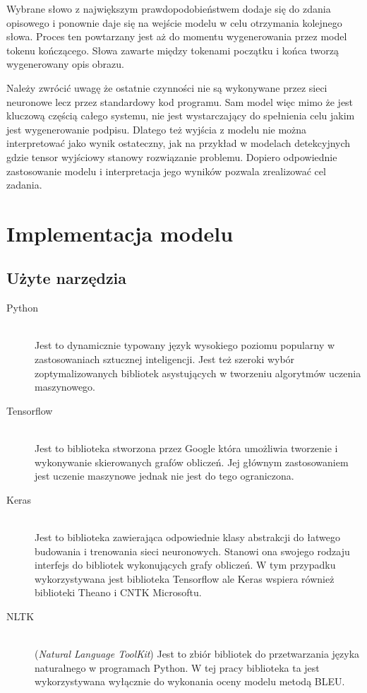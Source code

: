 Wybrane słowo z największym prawdopodobieństwem dodaje się do zdania opisowego i ponownie daje się na wejście modelu w celu otrzymania kolejnego słowa. Proces ten powtarzany jest aż do momentu wygenerowania przez model tokenu kończącego. Słowa zawarte między tokenami początku i końca tworzą wygenerowany opis obrazu.

Należy zwrócić uwagę że ostatnie czynności nie są wykonywane przez sieci neuronowe lecz przez standardowy kod programu. Sam model więc mimo że jest kluczową częścią całego systemu, nie jest wystarczający do spełnienia celu jakim jest wygenerowanie podpisu. Dlatego też wyjścia z modelu nie można interpretować jako wynik ostateczny, jak na przykład w modelach detekcyjnych gdzie tensor wyjściowy stanowy rozwiązanie problemu. Dopiero odpowiednie zastosowanie modelu i interpretacja jego wyników pozwala zrealizować cel zadania. 

\newpage

\section{Implementacja modelu}
\subsection{Użyte narzędzia}
\begin{description}
	\item[Python]     \hfill \\ Jest to dynamicznie typowany język wysokiego poziomu popularny w zastosowaniach sztucznej inteligencji. Jest też szeroki wybór zoptymalizowanych bibliotek asystujących w tworzeniu algorytmów uczenia maszynowego.
	\item[Tensorflow] \hfill \\ Jest to biblioteka stworzona przez Google która umożliwia tworzenie i wykonywanie skierowanych grafów obliczeń\cite{Tensorflow}. Jej głównym zastosowaniem jest uczenie maszynowe jednak nie jest do tego ograniczona.
	\item[Keras]      \hfill \\ Jest to biblioteka zawierająca odpowiednie klasy abstrakcji do łatwego budowania i trenowania sieci neuronowych.\cite{Keras} Stanowi ona swojego rodzaju interfejs do bibliotek wykonujących grafy obliczeń. W tym przypadku wykorzystywana jest biblioteka Tensorflow ale Keras wspiera również biblioteki Theano i CNTK Microsoftu.
	\item[NLTK]       \hfill \\ (\textit{Natural Language ToolKit}) Jest to zbiór bibliotek do przetwarzania języka naturalnego w programach Python.\cite{NLTK} W tej pracy biblioteka ta jest wykorzystywana wyłącznie do wykonania oceny modelu metodą BLEU. 
\end{description}
